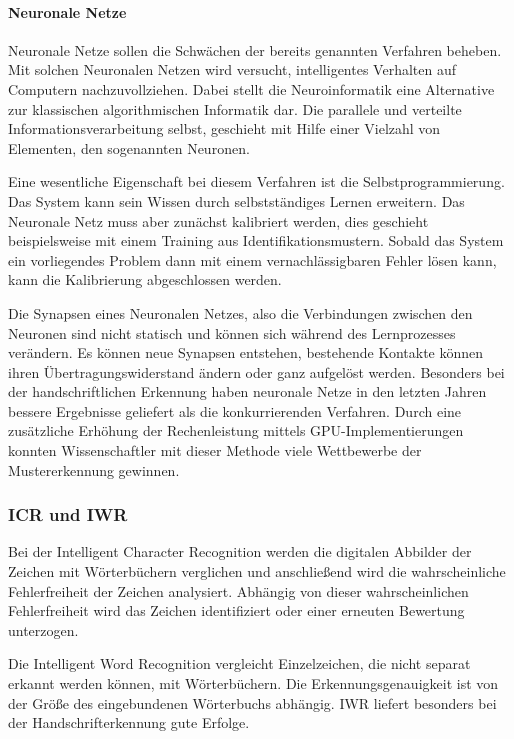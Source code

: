 \paragraph{Neuronale Netze}
Neuronale Netze sollen die Schwächen der bereits genannten Verfahren beheben. Mit solchen Neuronalen Netzen wird versucht, intelligentes Verhalten auf Computern nachzuvollziehen. Dabei stellt die Neuroinformatik eine Alternative zur klassischen algorithmischen Informatik dar. Die parallele und verteilte Informationsverarbeitung selbst, geschieht mit Hilfe einer Vielzahl von Elementen, den sogenannten Neuronen.

Eine wesentliche Eigenschaft bei diesem Verfahren ist die Selbstprogrammierung. Das System kann sein Wissen durch selbstständiges Lernen erweitern. Das Neuronale Netz muss aber zunächst kalibriert werden, dies geschieht beispielsweise mit einem Training aus Identifikationsmustern. Sobald das System ein vorliegendes Problem dann mit einem vernachlässigbaren Fehler lösen kann, kann die Kalibrierung abgeschlossen werden.

\newpage

Die Synapsen eines Neuronalen Netzes, also die Verbindungen zwischen den Neuronen sind nicht statisch und können sich während des Lernprozesses verändern. Es können neue Synapsen entstehen, bestehende Kontakte können ihren Übertragungswiderstand ändern oder ganz aufgelöst werden. Besonders bei der handschriftlichen Erkennung haben neuronale Netze in den letzten Jahren bessere Ergebnisse geliefert als die konkurrierenden Verfahren. Durch eine zusätzliche Erhöhung der Rechenleistung mittels GPU-Implementierungen konnten Wissenschaftler mit dieser Methode viele Wettbewerbe der Mustererkennung gewinnen. \cite{OCRB}

\subsubsection{ICR und IWR}
Bei der Intelligent Character Recognition werden die digitalen Abbilder der Zeichen mit Wörterbüchern verglichen und anschließend wird die wahrscheinliche Fehlerfreiheit der Zeichen analysiert. Abhängig von dieser wahrscheinlichen Fehlerfreiheit wird das Zeichen identifiziert oder einer erneuten Bewertung unterzogen.

Die Intelligent Word Recognition vergleicht Einzelzeichen, die nicht separat erkannt werden können, mit Wörterbüchern. Die Erkennungsgenauigkeit ist von der Größe des eingebundenen Wörterbuchs abhängig. IWR liefert besonders bei der Handschrifterkennung gute Erfolge.

